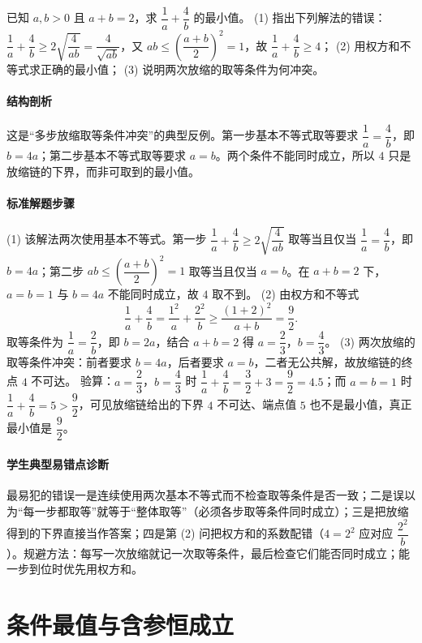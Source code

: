 \begin{problem}
已知 $a,b>0$ 且 $a+b=2$，求 $\dfrac1a+\dfrac4b$ 的最小值。
(1) 指出下列解法的错误：
$\dfrac1a+\dfrac4b\ge2\sqrt{\dfrac4{ab}}=\dfrac4{\sqrt{ab}}$，又 $ab\le\left(\dfrac{a+b}{2}\right)^2=1$，故 $\dfrac1a+\dfrac4b\ge4$；
(2) 用权方和不等式求正确的最小值；
(3) 说明两次放缩的取等条件为何冲突。
\end{problem}
\begin{solution}
\paragraph{结构剖析}
这是“多步放缩取等条件冲突”的典型反例。第一步基本不等式取等要求 $\dfrac1a=\dfrac4b$，即 $b=4a$；第二步基本不等式取等要求 $a=b$。两个条件不能同时成立，所以 $4$ 只是放缩链的下界，而非可取到的最小值。
\paragraph{标准解题步骤}
(1) 该解法两次使用基本不等式。第一步 $\dfrac1a+\dfrac4b\ge2\sqrt{\dfrac4{ab}}$ 取等当且仅当 $\dfrac1a=\dfrac4b$，即 $b=4a$；第二步 $ab\le\left(\dfrac{a+b}{2}\right)^2=1$ 取等当且仅当 $a=b$。在 $a+b=2$ 下，$a=b=1$ 与 $b=4a$ 不能同时成立，故 $4$ 取不到。
(2) 由权方和不等式
$$\frac1a+\frac4b=\frac{1^2}{a}+\frac{2^2}{b}\ge\frac{(1+2)^2}{a+b}=\frac92.$$
取等条件为 $\dfrac1a=\dfrac2b$，即 $b=2a$，结合 $a+b=2$ 得 $a=\dfrac23$，$b=\dfrac43$。
(3) 两次放缩的取等条件冲突：前者要求 $b=4a$，后者要求 $a=b$，二者无公共解，故放缩链的终点 $4$ 不可达。
验算：$a=\dfrac23$，$b=\dfrac43$ 时 $\dfrac1a+\dfrac4b=\dfrac32+3=\dfrac92=4.5$；而 $a=b=1$ 时 $\dfrac1a+\dfrac4b=5>\dfrac92$，可见放缩链给出的下界 $4$ 不可达、端点值 $5$ 也不是最小值，真正最小值是 $\dfrac92$。
\paragraph{学生典型易错点诊断}
最易犯的错误一是连续使用两次基本不等式而不检查取等条件是否一致；二是误以为“每一步都取等”就等于“整体取等”（必须各步取等条件同时成立）；三是把放缩得到的下界直接当作答案；四是第 (2) 问把权方和的系数配错（$4=2^2$ 应对应 $\dfrac{2^2}{b}$）。规避方法：每写一次放缩就记一次取等条件，最后检查它们能否同时成立；能一步到位时优先用权方和。
\end{solution}

\section{条件最值与含参恒成立}

